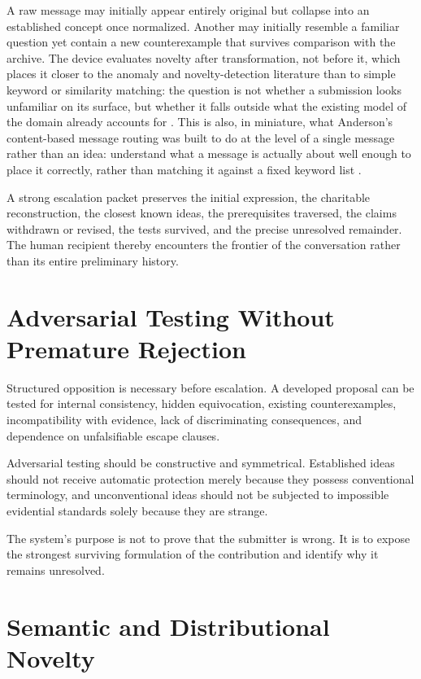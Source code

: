 \documentclass[11pt]{article}
\begin{document}
A raw message may initially appear entirely original but collapse into an established concept once normalized. Another may initially resemble a familiar question yet contain a new counterexample that survives comparison with the archive. The device evaluates novelty after transformation, not before it, which places it closer to the anomaly and novelty-detection literature than to simple keyword or similarity matching: the question is not whether a submission looks unfamiliar on its surface, but whether it falls outside what the existing model of the domain already accounts for \cite{markou2003a,markou2003b}. This is also, in miniature, what Anderson's content-based message routing was built to do at the level of a single message rather than an idea: understand what a message is actually about well enough to place it correctly, rather than matching it against a fixed keyword list \cite{anderson2022bubblecity}.

A strong escalation packet preserves the initial expression, the charitable reconstruction, the closest known ideas, the prerequisites traversed, the claims withdrawn or revised, the tests survived, and the precise unresolved remainder. The human recipient thereby encounters the frontier of the conversation rather than its entire preliminary history.

\section{Adversarial Testing Without Premature Rejection}

Structured opposition is necessary before escalation. A developed proposal can be tested for internal consistency, hidden equivocation, existing counterexamples, incompatibility with evidence, lack of discriminating consequences, and dependence on unfalsifiable escape clauses.

Adversarial testing should be constructive and symmetrical. Established ideas should not receive automatic protection merely because they possess conventional terminology, and unconventional ideas should not be subjected to impossible evidential standards solely because they are strange.

The system's purpose is not to prove that the submitter is wrong. It is to expose the strongest surviving formulation of the contribution and identify why it remains unresolved.

\section{Semantic and Distributional Novelty}
\end{document}
